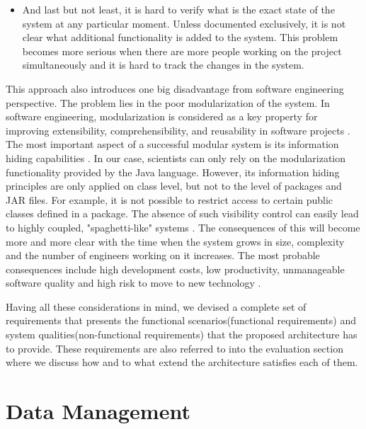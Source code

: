 \begin{itemize}
	\item And last but not least, it is hard to verify what is the exact state of the system at any particular moment. Unless documented exclusively, it is not clear what additional functionality is added to the system. This problem becomes more serious when there are more people working on the project simultaneously and it is hard to track the changes in the system.
		
\end{itemize}

This approach also introduces one big disadvantage from software engineering perspective. The problem lies in the poor modularization of the system. In software engineering, modularization is considered as a key property for improving extensibility, comprehensibility, and reusability in software projects \cite{Parnas}. The most important aspect of a successful modular system is its information hiding capabilities \cite{Srivastava}. In our case, scientists can only rely on the modularization functionality provided by the Java language. However, its information hiding principles are only applied on class level, but not to the level of packages and JAR files. For example, it is not possible to restrict access to certain public classes defined in a package. The absence of such visibility control can easily lead to highly coupled, "spaghetti-like" systems \cite{Eder}. The consequences of this will become more and more clear with the time when the system grows in size, complexity and the number of engineers working on it increases. The most probable consequences include high development costs, low productivity, unmanageable software quality and high risk to move to new technology \cite{Cai}.

Having all these considerations in mind, we devised a complete set of requirements that presents the functional scenarios(functional requirements) and system qualities(non-functional requirements) that the proposed architecture has to provide. These requirements are also referred to into the evaluation section where we discuss how and to what extend the architecture satisfies each of them.

\section{Data Management}


